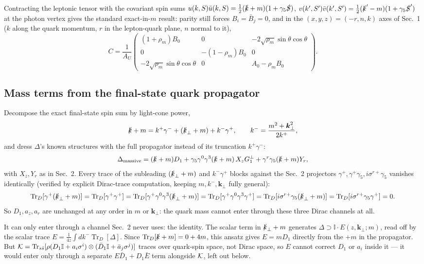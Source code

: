 \documentclass[10pt]{article}
\newcommand{\Tr}{\operatorname{Tr}}
\begin{document}
Contracting the leptonic tensor with the covariant spin sums
\(u(k,S)\bar u(k,S)=\tfrac12(\slashed k+m)(1+\gamma_5\slashed S)\),
\(v(k',S')\bar v(k',S')=\tfrac12(\slashed k'-m)(1+\gamma_5\slashed S')\)
at the photon vertex gives the standard exact-in-\(m\) result: parity
still forces \(B_i=\bar B_j=0\), and in the \((x,y,z)=(-r,n,k)\) axes of
Sec.~1 (\(k\) along the quark momentum, \(r\) in the lepton-quark plane,
\(n\) normal to it),
\[
C=\frac1{A_U}\begin{pmatrix}
(1+\rho_m)B_0 & 0 & -2\sqrt{\rho_m}\sin\theta\cos\theta\\
0 & -(1-\rho_m)B_0 & 0\\
-2\sqrt{\rho_m}\sin\theta\cos\theta & 0 & A_0-\rho_mB_0
\end{pmatrix} .
\]

\subsection*{Mass terms from the final-state quark propagator}

Decompose the exact final-state spin sum by light-cone power,
\[
\slashed k+m
=k^+\gamma^-+(\slashed k_\perp+m)+k^-\gamma^+,
\qquad
k^-=\frac{m^2+\boldsymbol k_\perp^2}{2k^+} ,
\]
and dress \(\Delta\)'s known structures with the full propagator instead
of its truncation \(k^+\gamma^-\):
\[
\Delta_{\rm massive}=(\slashed k+m)D_1
+\gamma_5\gamma^0\gamma^3(\slashed k+m)\,X_zG_1^\perp
+\gamma^r\gamma_5(\slashed k+m)Y_r ,
\]
with \(X_z,Y_r\) as in Sec.~2.  Every trace of the subleading
\((\slashed k_\perp+m)\) and \(k^-\gamma^+\) blocks against the Sec.~2
projectors \(\gamma^+,\gamma^+\gamma_5,i\sigma^{r+}\gamma_5\) vanishes
identically (verified by explicit Dirac-trace computation, keeping
\(m,k^-,\boldsymbol k_\perp\) fully general):
\[
\Tr_D[\gamma^+(\slashed k_\perp+m)]=\Tr_D[\gamma^+\gamma^+]
=\Tr_D[\gamma^+\gamma^0\gamma^3(\slashed k_\perp+m)]
=\Tr_D[\gamma^+\gamma^0\gamma^3\gamma^+]
=\Tr_D[i\sigma^{r+}\gamma_5(\slashed k_\perp+m)]
=\Tr_D[i\sigma^{r+}\gamma_5\gamma^+]=0 .
\]
So \(D_1,a_z,a_r\) are unchanged at any order in \(m\) or
\(\boldsymbol k_\perp\): the quark mass cannot enter through these three
Dirac channels at all.

It can only enter through a channel Sec.~2 never uses: the identity.
The scalar term in \(\slashed k_\perp+m\) generates
\(\Delta\supset\mathbb I\cdot E(z,\boldsymbol k_\perp;m)\), read off by
the scalar trace \(E=\tfrac1{4z}\int dk^-\Tr_D[\Delta]\).  Since
\(\Tr_D[\slashed k+m]=0+4m\), this ansatz gives \(E=mD_1\) directly from
the \(+m\) in the propagator.  But
\({\cal K}=\Tr_{s\bar s}[\rho(D_1\mathbb I+a_i\sigma^i)\otimes
(\bar D_1\mathbb I+\bar a_j\sigma^j)]\) traces over quark-spin space, not
Dirac space, so \(E\) cannot correct \(D_1\) or \(a_i\) inside it — it
would enter only through a separate \(E\bar D_1+D_1\bar E\) term
alongside \({\cal K}\), left out below.
\end{document}
